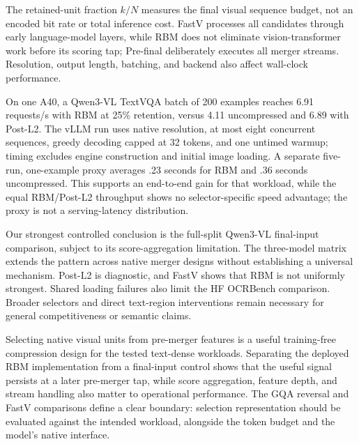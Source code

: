 \documentclass[smallabstract,smallcaptions]{dccpaper}
\begin{document}
The retained-unit fraction $k/N$ measures the final visual sequence budget, not an encoded bit rate or total inference cost. FastV processes all candidates through early language-model layers, while RBM does not eliminate vision-transformer work before its scoring tap; Pre-final deliberately executes all merger streams. Resolution, output length, batching, and backend also affect wall-clock performance.

On one A40, a Qwen3-VL TextVQA batch of 200 examples reaches 6.91 requests/s with RBM at 25\% retention, versus 4.11 uncompressed and 6.89 with Post-L2. The vLLM run uses native resolution, at most eight concurrent sequences, greedy decoding capped at 32 tokens, and one untimed warmup; timing excludes engine construction and initial image loading. A separate five-run, one-example proxy averages .23 seconds for RBM and .36 seconds uncompressed. This supports an end-to-end gain for that workload, while the equal RBM/Post-L2 throughput shows no selector-specific speed advantage; the proxy is not a serving-latency distribution.

Our strongest controlled conclusion is the full-split Qwen3-VL final-input comparison, subject to its score-aggregation limitation. The three-model matrix extends the pattern across native merger designs without establishing a universal mechanism. Post-L2 is diagnostic, and FastV shows that RBM is not uniformly strongest. Shared loading failures also limit the HF OCRBench comparison. Broader selectors and direct text-region interventions remain necessary for general competitiveness or semantic claims.

Selecting native visual units from pre-merger features is a useful training-free compression design for the tested text-dense workloads. Separating the deployed RBM implementation from a final-input control shows that the useful signal persists at a later pre-merger tap, while score aggregation, feature depth, and stream handling also matter to operational performance. The GQA reversal and FastV comparisons define a clear boundary: selection representation should be evaluated against the intended workload, alongside the token budget and the model's native interface.



\end{document}
